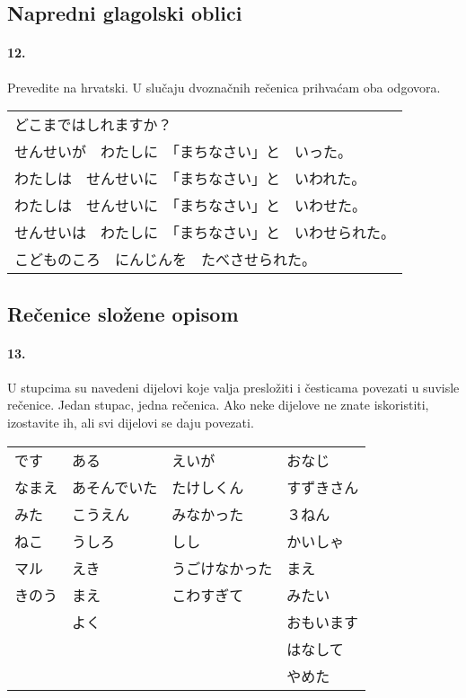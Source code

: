 \documentclass[12pt]{article}
\begin{document}
	\subsection{Napredni glagolski oblici}
	
	\paragraph{12.} Prevedite na hrvatski. U slučaju dvoznačnih rečenica prihvaćam oba odgovora.
	
	\begin{tabularx}{\textwidth}{X}
		どこまではしれますか？\\
		せんせいが　わたしに　「まちなさい」と　いった。\\
		わたしは　せんせいに　「まちなさい」と　いわれた。\\
		わたしは　せんせいに　「まちなさい」と　いわせた。\\
		せんせいは　わたしに　「まちなさい」と　いわせられた。\\
		こどものころ　にんじんを　たべさせられた。\\
	\end{tabularx}

	\subsection{Rečenice složene opisom}
	
	\paragraph{13.} U stupcima su navedeni dijelovi koje valja presložiti i česticama povezati u suvisle rečenice. Jedan stupac, jedna rečenica. Ako neke dijelove ne znate iskoristiti, izostavite ih, ali svi dijelovi se daju povezati.
	
	\begin{tabularx}{\textwidth}{X X X X}
		です&ある&えいが&おなじ\\
		なまえ&あそんでいた&たけしくん&すずきさん\\
		みた&こうえん&みなかった&３ねん\\
		ねこ&うしろ&しし&かいしゃ\\
		マル&えき&うごけなかった&まえ\\
		きのう&まえ&こわすぎて&みたい\\
		&よく&&おもいます\\
		&&&はなして\\
		&&&やめた\\
	\end{tabularx}
\end{document}
